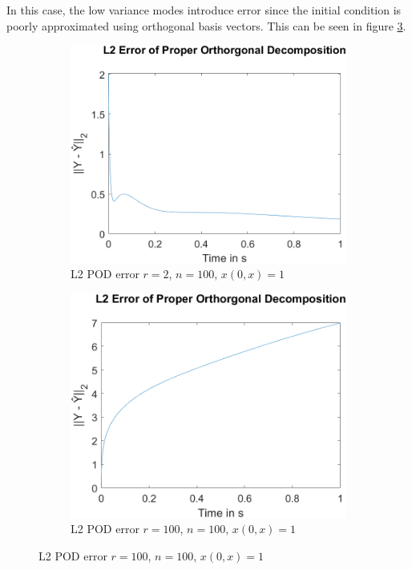 In this case, the low variance modes introduce error since the initial condition is poorly approximated using orthogonal basis vectors.
This can be seen in figure \ref{fig-pod-100}.
\begin{figure}[H]
\begin{subfigure}[b]{0.5\textwidth}
\centering
\includegraphics[width=\textwidth]{images/L2_Proper Orthorgonal Decomposition_2_100}
\caption{L2 POD error $r=2$, $n=100$, $x(0, x) = 1$}
\label{fig:fig-pod-2-100}
\end{subfigure}
\begin{subfigure}[b]{0.5\textwidth}
\centering
\includegraphics[width=\textwidth]{images/L2_Proper Orthorgonal Decomposition_100_100}
\caption{L2 POD error $r=100$, $n=100$, $x(0, x) = 1$}
\label{fig:fig-pod-100-100}
\end{subfigure}
\label{fig-pod-100}
\end{figure}
